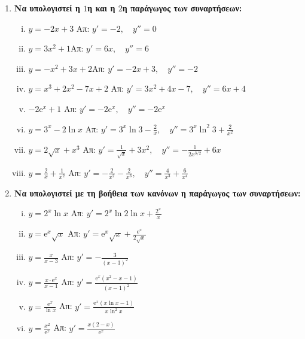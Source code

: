 


\everymath{\displaystyle}
\pagestyle{askhseis}



\begin{center}
  \minibox{\bfseries\large \textcolor{Col1}{Ασκήσεις στις Παραγώγους}}
\end{center}

\vspace{\baselineskip}


\begin{enumerate}
  \item {\bfseries Να υπολογιστεί η $1$η και η $2$η παράγωγος των συναρτήσεων:}
    \begin{enumerate}[i)]
      \item $ y=-2x+3 $ \hfill Απ: $ y'=-2,\quad y''=0 $ 
      \item $y=3x^2+1$\hfill Απ: $y'=6x,\quad y''=6$
      \item $y=-x^2+3x+2$\hfill Απ: $y'=-2x+3,\quad y''=-2$
      \item $ y=x^{3}+2x^{2}-7x+2 $ \hfill Απ: $ y'=3x^{2}+4x-7, \quad y''=6x+4$ 
      \item $ -2\mathrm{e}^{x} + 1 $ \hfill Απ: $ y'=-2 \mathrm{e}^{x} , 
        \quad y''=-2 \mathrm{e}^{x} $
      \item $ y = 3^{x} - 2\ln{x} $ 
        \hfill Απ: $ y' = 3^{x}\ln{3} - \frac{2}{x}, 
        \quad y'' = 3^{x}\ln^{2}3 + \frac{2}{x^{2}}  $
      \item $ y= 2\sqrt{ x } + x^{3} $ 
        \hfill Απ: $ y'= \frac{1}{\sqrt{ x }} + 3x^{2}, \quad y''=
        - \frac{1}{2 x^{3/2}} + 6x $
      \item $y= \frac{2}{x} + \frac{1}{x^{2}} $
        \hfill Απ: $y'=-\frac{2}{x^2} - \frac{2}{x^3},
        \quad y''= \frac{4}{x^3}+\frac{6}{x^4}$
    \end{enumerate}

  \item {\bfseries Να υπολογιστεί με τη βοήθεια των κανόνων η παράγωγος των συναρτήσεων:}
    \begin{enumerate}[i)]
      \item $ y= 2^{x} \ln{x} $ 
        \hfill Απ: $ y' = 2^{x} \ln{2} \ln{x} + \frac{2^{x}}{x}$ 
      \item $ y= \mathrm{e}^{x} \sqrt{x} $ 
        \hfill Απ: $ y'= \mathrm{e}^{x} \sqrt{x} + \frac{\mathrm{e}^{x}}{2 \sqrt{x}}$ 
      \item $ y= \frac{x}{x-3} $ \hfill Απ: $ y'= - \frac{3}{(x-3)^{2}} $  
      \item $ y = \frac{x\cdot \mathrm{e}^{x}}{x-1} $ 
        \hfill Απ: $ y' = \frac{\mathrm{e}^{x} (x^{2}-x-1)}{(x-1)^{2}} $ 
      \item $ y= \frac{\mathrm{e}^{x}}{\ln{x}} $ \hfill Απ: $ y'=
        \frac{\mathrm{e}^{x} (x \ln{x} -1)}{x \ln^{2}{x}} $ 
      \item $ y= \frac{x^{2}}{\mathrm{e}^{x}} $ 
        \hfill Απ: $ y' = \frac{x(2-x)}{\mathrm{e}^{x}} $ 
    \end{enumerate}


\end{enumerate}
